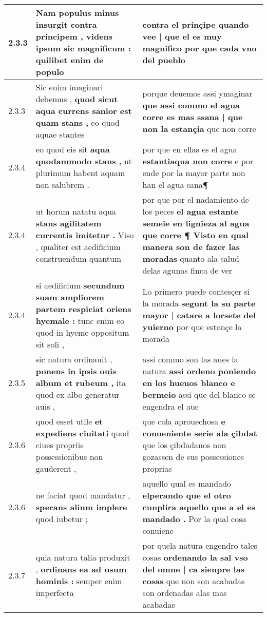 \begin{tabular}{|p{1cm}|p{6.5cm}|p{6.5cm}|}
2.3.3 & Nam populus minus insurgit contra principem , \textbf{ videns ipsum sic magnificum : } quilibet enim de populo & contra el prinçipe \textbf{ quando vee | que el es muy magnifico } por que cada vno del pueblo \\\hline
2.3.3 & Sic enim imaginari debemus , \textbf{ quod sicut aqua currens sanior est quam stans , } eo quod aquae stantes & porque deuemos assi ymaginar \textbf{ que assi commo el agua corre es mas ssana | que non la estançia } que non corre \\\hline
2.3.4 & eo quod eis sit \textbf{ aqua quodammodo stans , } ut plurimum habent aquam non salubrem . & por que en ellas es el agua \textbf{ estantiaqua non corre } e por ende por la mayor parte non han el agua sana¶ \\\hline
2.3.4 & ut horum natatu aqua \textbf{ stans agilitatem currentis imitetur . } Viso , qualiter est aedificium construendum quantum & por que por el nadamiento de los peces \textbf{ el agua estante semeie en lignieza al agua que corre ¶ Visto en qual manera son de fazer las moradas } quanto ala salud delas agunas finca de ver \\\hline
2.3.4 & si aedificium \textbf{ secundum suam ampliorem partem respiciat oriens hyemale : } tunc enim eo quod in hyeme oppositum sit soli , & Lo primero puede contesçer si la morada \textbf{ segunt la su parte mayor | catare a lorsete del yuierno } por que estonçe la morada \\\hline
2.3.5 & sic natura ordinauit , \textbf{ ponens in ipsis ouis album et rubeum , } ita quod ex albo generatur auis , & assi commo son las aues la natura \textbf{ assi ordeno poniendo en los hueuos blanco e bermeio } assi que del blanco se engendra el aue \\\hline
2.3.6 & quod esset utile \textbf{ et expediens ciuitati } quod ciues propriis possessionibus non gauderent , & que cola aprouechosa \textbf{ e conueniente serie ala çibdat } que los çibdadanos non gozassen de sus possessiones proprias \\\hline
2.3.6 & ne faciat quod mandatur , \textbf{ sperans alium implere } quod iubetur ; & aquello qual es mandado \textbf{ elperando que el otro cunplira aquello que a el es mandado . } Por la qual cosa conuiene \\\hline
2.3.7 & quia natura talia produxit , \textbf{ ordinans ea ad usum hominis : } semper enim imperfecta & por quela natura engendro tales cosas \textbf{ ordenando la sal vso del omne | ca sienpre las cosas } que non son acabadas son ordenadas alas mas acabadas \\\hline

\end{tabular}
